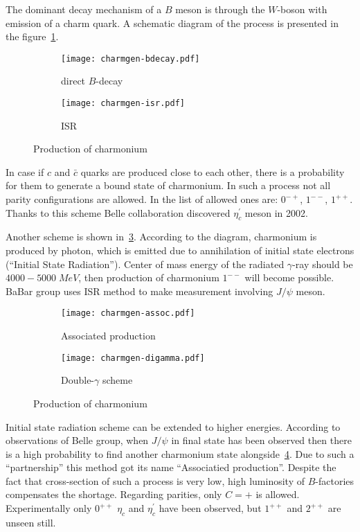 The dominant decay mechanism of a $B$ meson is through the $W$-boson with emission of a charm quark. A schematic diagram of the process is presented in the figure~\cref{fig:charmgen-bdecay}.

\begin{figure}[H]
    \centering
    \begin{subfigure}[b]{0.4\textwidth}
        \texttt{[image: charmgen-bdecay.pdf]}
        \caption{direct $B$-decay} \label{fig:charmgen-bdecay}
    \end{subfigure}
    \begin{subfigure}[b]{0.4\textwidth}
        \texttt{[image: charmgen-isr.pdf]}
        \caption{ISR} \label{fig:charmgen-isr}
    \end{subfigure}
    \caption{Production of charmonium}
\end{figure}

In case if $c$ and $\bar{c}$ quarks are produced close to each other, there is a probability for them to generate a bound state of charmonium. In such a process not all parity configurations are allowed. In the list of allowed ones are: $0^{-+}$, $1^{--}$, $1^{++}$. Thanks to this scheme Belle collaboration discovered $\eta^\prime_c$ meson in 2002.~\cite{bdecay-etacprime}

Another scheme is shown in~\cref{fig:charmgen-isr}. According to the diagram, charmonium is produced by photon, which is emitted due to annihilation of initial state electrons (``Initial State Radiation''). Center of mass energy of the radiated $\gamma$-ray should be $4000-5000\;MeV$, then production of charmonium $1^{--}$ will become possible. BaBar group uses ISR method to make measurement involving $J/\psi$ meson.~\cite{isr-jpsi}

\begin{figure}[H]
    \centering
    \begin{subfigure}[b]{0.4\textwidth}
        \texttt{[image: charmgen-assoc.pdf]}
        \caption{Associated production} \label{fig:charmgen-assoc}
    \end{subfigure}
    \begin{subfigure}[b]{0.4\textwidth}
        \texttt{[image: charmgen-digamma.pdf]}
        \caption{Double-$\gamma$ scheme} \label{fig:charmgen-digamma}
    \end{subfigure}
    \caption{Production of charmonium}
\end{figure}

Initial state radiation scheme can be extended to higher energies. According to observations of Belle group, when $J/\psi$ in final state has been observed then there is a high probability to find another charmonium state alongside~\cref{fig:charmgen-assoc}. Due to such a ``partnership'' this method got its name ``Associatied production''. Despite the fact that cross-section of such a process is very low, high luminosity of $B$-factories compensates  the shortage. Regarding parities, only $C=+$ is allowed. Experimentally only $0^{++}$ $\eta_c$ and $\eta_c^\prime$ have been observed, but $1^{++}$ and $2^{++}$ are unseen still.~\cite{assoc-prod}

